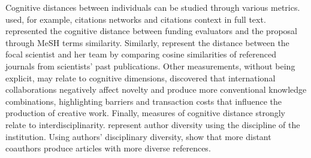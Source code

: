         Cognitive distances between individuals can be studied through various metrics. \cite{kumar2017author} used, for example, citations networks and citations context in full text. %
        \cite{boudreau2016looking} represented the cognitive distance between funding evaluators and the proposal through MeSH terms similarity. Similarly, \cite{ayoubi2017origins} represent the distance between the focal scientist and her team by comparing cosine similarities of referenced journals from scientists' past publications. Other measurements, without being explicit, may relate to cognitive dimensions, \cite{wagner2019international} discovered that international collaborations negatively affect novelty and produce more conventional knowledge combinations, highlighting barriers and transaction costs that influence the production of creative work.
        Finally, measures of cognitive distance strongly relate to interdisciplinarity. \cite{petersen2021grand} represent author diversity using the discipline of the institution. Using authors' disciplinary diversity, \cite{abramo2018comparison} show that more distant coauthors produce articles with more diverse references. \\


